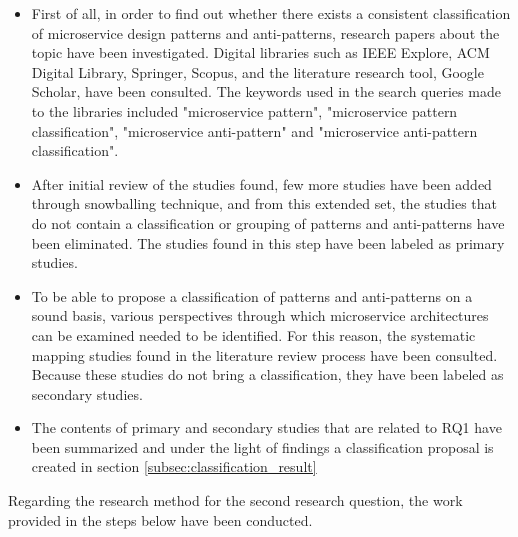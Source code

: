 \documentclass{Configuration_Files/PoliMi3i_thesis}
\begin{document}
\begin{itemize}
    \item First of all, in order to find out whether there exists a consistent classification of microservice design patterns and anti-patterns, research papers about the topic have been investigated.
    Digital libraries such as IEEE Explore, ACM Digital Library, Springer, Scopus, and the literature research tool, Google Scholar, have been consulted.
    The keywords used in the search queries made to the libraries included "microservice pattern", "microservice pattern classification", "microservice anti-pattern" and "microservice anti-pattern classification".

    \item After initial review of the studies found, few more studies have been added through snowballing technique, and from this extended set, the studies that do not contain a classification or grouping of patterns and anti-patterns have been eliminated.
    The studies found in this step have been labeled as primary studies.
    
    \item To be able to propose a classification of patterns and anti-patterns on a sound basis, various perspectives through which microservice architectures can be examined needed to be identified.
    For this reason, the systematic mapping studies found in the literature review process have been consulted.
    Because these studies do not bring a classification, they have been labeled as secondary studies.
    
    \item The contents of primary and secondary studies that are related to RQ1 have been summarized and under the light of findings a classification proposal is created in section \ref{subsec:classification_result}
\end{itemize}

Regarding the research method for the second research question, the work provided in the steps below have been conducted.
\end{document}

